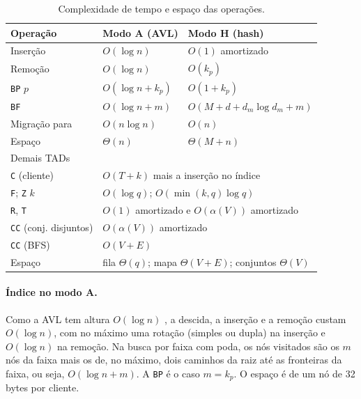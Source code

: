 \documentclass[letterpaper]{article} %
\begin{document}
\begin{table}[t]
\centering
\footnotesize
\setlength{\tabcolsep}{2.5pt}
\begin{tabular}{lll}
\toprule
Opera\c{c}\~ao & Modo A (AVL) & Modo H (hash) \\
\midrule
Inser\c{c}\~ao & $O(\log n)$ & $O(1)$ amortizado \\
Remo\c{c}\~ao & $O(\log n)$ & $O(k_p)$ \\
\texttt{BP} $p$ & $O(\log n + k_p)$ & $O(1 + k_p)$ \\
\texttt{BF} & $O(\log n + m)$ & $O(M + d + d_m \log d_m + m)$ \\
Migra\c{c}\~ao para & $O(n \log n)$ & $O(n)$ \\
Espa\c{c}o & $\Theta(n)$ & $\Theta(M + n)$ \\
\midrule
\multicolumn{3}{l}{Demais TADs} \\
\midrule
\texttt{C} (cliente) & \multicolumn{2}{l}{$O(T + k)$ mais a inser\c{c}\~ao no \'indice} \\
\texttt{F}; \texttt{Z} $k$ & \multicolumn{2}{l}{$O(\log q)$; $O(\min(k,q)\log q)$} \\
\texttt{R}, \texttt{T} & \multicolumn{2}{l}{$O(1)$ amortizado e $O(\alpha(V))$ amortizado} \\
\texttt{CC} (conj. disjuntos) & \multicolumn{2}{l}{$O(\alpha(V))$ amortizado} \\
\texttt{CC} (BFS) & \multicolumn{2}{l}{$O(V + E)$} \\
Espa\c{c}o & \multicolumn{2}{l}{fila $\Theta(q)$; mapa $\Theta(V+E)$; conjuntos $\Theta(V)$} \\
\bottomrule
\end{tabular}
\caption{Complexidade de tempo e espa\c{c}o das opera\c{c}\~oes.}
\label{tab:complexidade}
\end{table}

\paragraph{\'Indice no modo A.} Como a AVL tem altura $O(\log n)$ \citep{adelson1962}, a descida, a inser\c{c}\~ao e a remo\c{c}\~ao custam $O(\log n)$, com no m\'aximo uma rota\c{c}\~ao (simples ou dupla) na inser\c{c}\~ao e $O(\log n)$ na remo\c{c}\~ao. Na busca por faixa com poda, os n\'os visitados s\~ao os $m$ n\'os da faixa mais os de, no m\'aximo, dois caminhos da raiz at\'e as fronteiras da faixa, ou seja, $O(\log n + m)$. A \texttt{BP} \'e o caso $m = k_p$. O espa\c{c}o \'e de um n\'o de 32 bytes por cliente.
\end{document}
